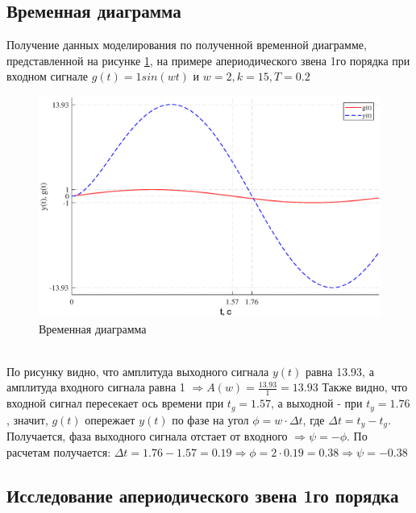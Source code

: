 \documentclass[a4paper,12pt]{article}
\renewcommand{\figurename}{Рисунок}
\begin{document}
	
	\newpage
	\begin{center}
		\section{Временная диаграмма}
	\end{center}
	\par
	Получение данных моделирования по полученной временной диаграмме, представленной на рисунке \ref{prim}, на примере апериодического звена 1го порядка при входном сигнале $g(t)=1sin(wt)$ и $w=2,k=15, T=0.2$
	\begin{figure}[h!]
		\renewcommand{\figurename}{Рисунок}
		\centering
		\includegraphics[width=6in]{prim3.eps}
		\caption{Временная диаграмма}
		\label{prim}
	\end{figure}\\

	По рисунку видно, что амплитуда выходного сигнала $y(t)$ равна 13.93, а амплитуда входного сигнала равна 1 $\Rightarrow A(w)=\frac{13.93}{1}=13.93$ Также видно, что входной сигнал пересекает ось времени при $t_g=1.57$, а выходной - при $t_y=1.76$, значит, $g(t)$ опережает $y(t)$ по фазе на угол $\phi=w\cdot \Delta t$, где $\Delta t=t_y-t_g$. Получается, фаза выходного сигнала отстает от входного $\Rightarrow \psi=-\phi$. По расчетам получается: $\Delta t = 1.76-1.57=0.19 \Rightarrow \phi=2\cdot0.19=0.38 \Rightarrow \psi=-0.38$     
	
	




	\newpage
	\begin{center}
	\section{Исследование апериодического звена 1го порядка}
	\end{center}
\end{document}

